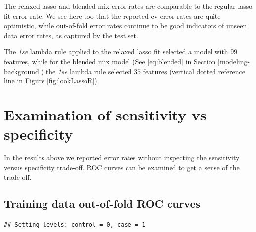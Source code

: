 \documentclass[
]{book}
\newenvironment{Shaded}{\begin{snugshade}}{\end{snugshade}}
\newcommand{\CommentTok}[1]{\textcolor[rgb]{0.56,0.35,0.01}{\textit{#1}}}
\newcommand{\DataTypeTok}[1]{\textcolor[rgb]{0.13,0.29,0.53}{#1}}
\newcommand{\FloatTok}[1]{\textcolor[rgb]{0.00,0.00,0.81}{#1}}
\newcommand{\KeywordTok}[1]{\textcolor[rgb]{0.13,0.29,0.53}{\textbf{#1}}}
\newcommand{\NormalTok}[1]{#1}
\newcommand{\OperatorTok}[1]{\textcolor[rgb]{0.81,0.36,0.00}{\textbf{#1}}}
\newcommand{\StringTok}[1]{\textcolor[rgb]{0.31,0.60,0.02}{#1}}
\begin{document}
The relaxed lasso and blended mix error rates are comparable to the
regular lasso fit error rate. We see here too that the reported cv
error rates are quite optimistic, while out-of-fold error rates
continue to be good indicators of unseen data error rates, as captured
by the test set.

The \emph{1se} lambda rule applied to the relaxed lasso fit selected a model with
\(99\) features,
while for the blended mix model
(See \eqref{eq:blended} in Section \ref{modeling-background})
the \emph{1se} lambda rule selected
\(35\) features (vertical
dotted reference line in Figure \ref{fig:lookLassoR}).

\hypertarget{examination-of-sensitivity-vs-specificity}{%
\section{Examination of sensitivity vs specificity}\label{examination-of-sensitivity-vs-specificity}}

In the results above we reported error rates without inspecting the
sensitivity versus specificity trade-off. ROC curves can be examined
to get a sense of the trade-off.

\hypertarget{training-data-out-of-fold-roc-curves}{%
\subsection{Training data out-of-fold ROC curves}\label{training-data-out-of-fold-roc-curves}}

\begin{Shaded}
\end{Shaded}

\begin{verbatim}
## Setting levels: control = 0, case = 1
\end{verbatim}
\end{document}
